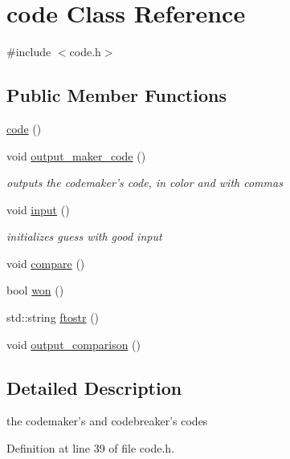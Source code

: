 \hypertarget{classcode}{\section{code Class Reference}
\label{classcode}
}


{\ttfamily \#include $<$code.\-h$>$}

\subsection*{Public Member Functions}
\begin{DoxyCompactItemize}
\item 
\hyperlink{classcode_a4e71026d8a0bc0d948cce66ebbeb3b67}{code} ()
\item 
void \hyperlink{classcode_a82e60a4ea6fc2d1aa2edb3fbcbb7d39e}{output\-\_\-maker\-\_\-code} ()
\begin{DoxyCompactList}\small\item\em outputs the codemaker's code, in color and with commas \end{DoxyCompactList}\item 
void \hyperlink{classcode_a7c09c4c8205ad589cc6ea49afc45df24}{input} ()
\begin{DoxyCompactList}\small\item\em initializes guess with good input \end{DoxyCompactList}\item 
void \hyperlink{classcode_a28c10163c30d1301531a3388587a5c90}{compare} ()
\item 
bool \hyperlink{classcode_a5d9db095e4024e760f54837e90f53d09}{won} ()
\item 
std\-::string \hyperlink{classcode_a11e1f1759a86360ebab83177e8e44d87}{ftostr} ()
\item 
void \hyperlink{classcode_ac8bd60f045bc4f87fc4a8ff9bcb64ea3}{output\-\_\-comparison} ()
\end{DoxyCompactItemize}


\subsection{Detailed Description}
the codemaker's and codebreaker's codes 

Definition at line 39 of file code.\-h.



